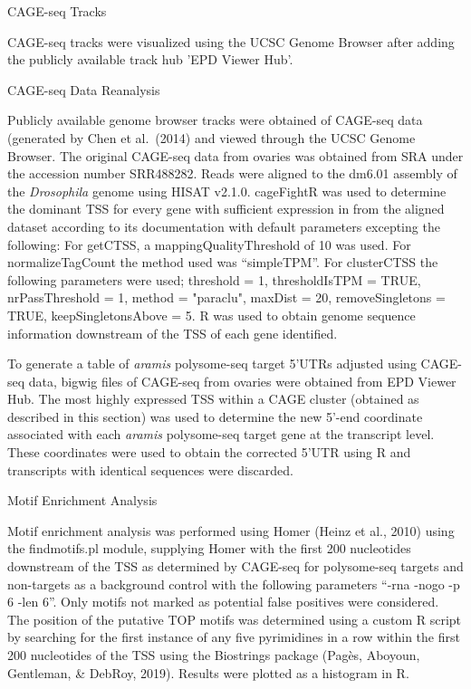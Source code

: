 \documentclass[12pt,twoside]{reedthesis}
\begin{document}
{CAGE-seq Tracks}

CAGE-seq tracks were visualized using the UCSC Genome Browser after
adding the publicly available track hub 'EPD Viewer Hub'.

{CAGE-seq Data Reanalysis}

Publicly available genome browser tracks were obtained of CAGE-seq data
(generated by Chen et al.~(2014) and viewed through the UCSC Genome
Browser. The original CAGE-seq data from ovaries was obtained from SRA
under the accession number SRR488282. Reads were aligned to the dm6.01
assembly of the \emph{Drosophila} genome using HISAT v2.1.0. cageFightR was
used to determine the dominant TSS for every gene with sufficient
expression in from the aligned dataset according to its documentation
with default parameters excepting the following: For getCTSS, a
mappingQualityThreshold of 10 was used. For normalizeTagCount the method
used was ``simpleTPM''. For clusterCTSS the following parameters were
used; threshold = 1, thresholdIsTPM = TRUE, nrPassThreshold = 1, method
= "paraclu", maxDist = 20, removeSingletons = TRUE,
keepSingletonsAbove = 5. R was used to obtain genome sequence
information downstream of the TSS of each gene identified.

To generate a table of \emph{aramis} polysome-seq target 5'UTRs adjusted
using CAGE-seq data, bigwig files of CAGE-seq from ovaries were obtained
from EPD Viewer Hub. The most highly expressed TSS within a CAGE cluster
(obtained as described in this section) was used to determine the new
5'-end coordinate associated with each \emph{aramis} polysome-seq target gene
at the transcript level. These coordinates were used to obtain the
corrected 5'UTR using R and transcripts with identical sequences were
discarded.

{Motif Enrichment Analysis}

Motif enrichment analysis was performed using Homer
(Heinz et al., 2010) using the
findmotifs.pl module, supplying Homer with the first 200 nucleotides
downstream of the TSS as determined by CAGE-seq for polysome-seq targets
and non-targets as a background control with the following parameters
``-rna -nogo -p 6 -len 6''. Only motifs not marked as potential false
positives were considered. The position of the putative TOP motifs was
determined using a custom R script by searching for the first instance
of any five pyrimidines in a row within the first 200 nucleotides of the
TSS using the Biostrings package
(Pagès, Aboyoun, Gentleman, \& DebRoy, 2019). Results were plotted as
a histogram in R.
\end{document}
